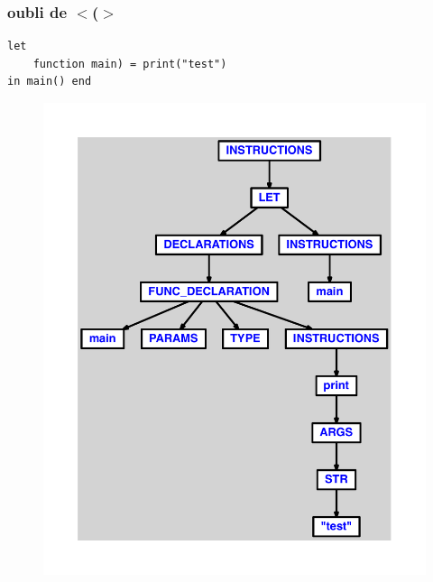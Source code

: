 \documentclass{article}
\begin{document}
\subsubsection{oubli de $ < $($ > $}
\begin{lstlisting}
let
	function main) = print("test")
in main() end
\end{lstlisting}
\newpage
\begin{figure}[H]
\centering
\includegraphics[max width=\textwidth]{ast/ast_216.pdf}
\end{figure}
\newpage
\end{document}
